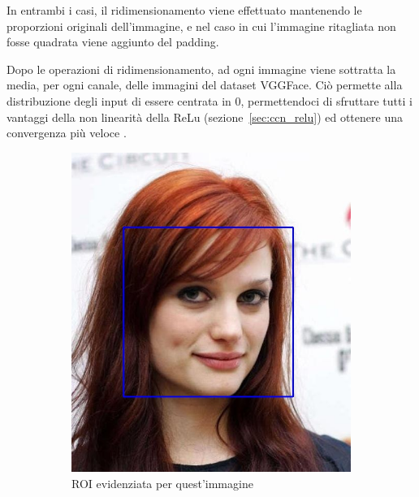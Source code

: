 In entrambi i casi, il ridimensionamento viene effettuato mantenendo le proporzioni originali dell'immagine, e nel caso in cui l'immagine ritagliata non fosse quadrata viene aggiunto del padding. 

Dopo le operazioni di ridimensionamento, ad ogni immagine viene sottratta la media, per ogni canale, delle immagini del dataset VGGFace. Ciò permette alla distribuzione degli input di essere centrata in $0$, permettendoci di sfruttare tutti i vantaggi della non linearità della ReLu (sezione~\ref{sec:ccn_relu}) ed ottenere una convergenza più veloce \cite{miviaage}.

\begin{figure}[ht]
\centering
\begin{subfigure}{0.3\textwidth}
\includegraphics[width=\textwidth]{./Images/detection.jpg}
\caption{ROI evidenziata per quest'immagine}
\label{sfig:detection}
\end{subfigure}
\hspace{0.1\textwidth}
\begin{subfigure}{0.3\textwidth}

\end{subfigure}
\end{figure}
